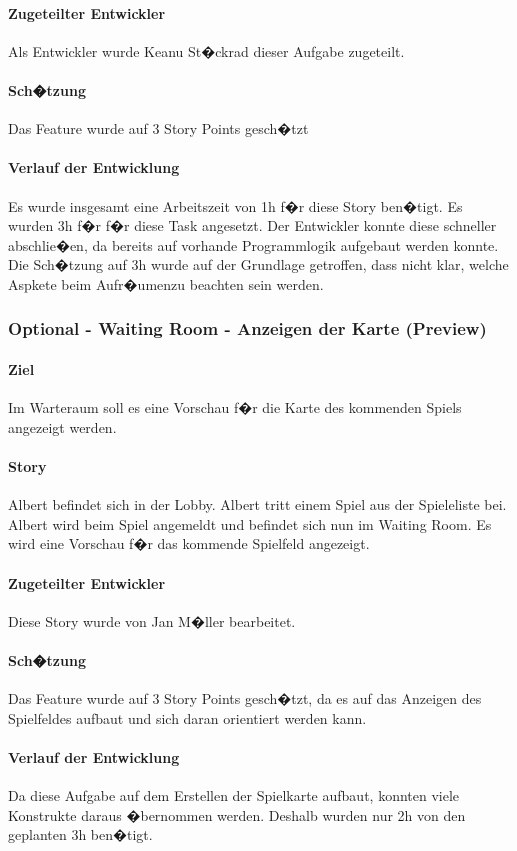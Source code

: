 \documentclass[12pt, titlepage]{scrartcl}
\begin{document}
			\paragraph{Zugeteilter Entwickler} Als Entwickler wurde Keanu St�ckrad dieser Aufgabe zugeteilt.
			\paragraph{Sch�tzung}
			Das Feature wurde auf 3 Story Points gesch�tzt
			\paragraph{Verlauf der Entwicklung} 
			Es wurde insgesamt eine Arbeitszeit von 1h f�r diese Story ben�tigt. Es wurden 3h f�r f�r diese Task angesetzt. Der Entwickler konnte diese schneller abschlie�en, da bereits auf vorhande Programmlogik aufgebaut werden konnte. Die Sch�tzung auf 3h wurde auf der Grundlage getroffen, dass nicht klar, welche Aspkete beim \glqq Aufr�umen\grqq zu beachten sein werden.
			
			\subsubsection{Optional - Waiting Room - Anzeigen der Karte (Preview)}
			\paragraph{Ziel} Im Warteraum soll es eine Vorschau f�r die Karte des kommenden Spiels angezeigt werden.
			\paragraph{Story} Albert befindet sich in der Lobby. Albert tritt einem Spiel aus der Spieleliste bei. Albert wird beim Spiel angemeldt und befindet sich nun im Waiting Room. Es wird eine Vorschau f�r das kommende Spielfeld angezeigt.
			\paragraph{Zugeteilter Entwickler} Diese Story wurde von Jan M�ller bearbeitet.
			\paragraph{Sch�tzung}
			Das Feature wurde auf 3 Story Points gesch�tzt, da es auf das Anzeigen des Spielfeldes aufbaut und sich daran orientiert werden kann.
			\paragraph{Verlauf der Entwicklung} 
			Da diese Aufgabe auf dem Erstellen der Spielkarte aufbaut, konnten viele Konstrukte daraus �bernommen werden. Deshalb wurden nur 2h von den geplanten 3h ben�tigt.
			
\end{document}
